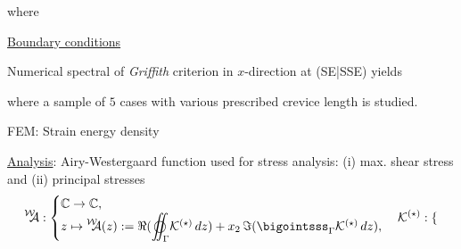 \documentclass[25pt, a0paper,
portrait,
margin=2mm, 
innermargin=2mm, 
blockverticalspace=7mm, %
colspace=2mm, %
subcolspace=0mm]{tikzposter}
\makeatletter
\newcommand*{\inputfig}[3][htb]{{
    \def\fps@figure{#1}
    \def\DIR{#2}
    \def\LABEL{#3}
    \graphicspath{{\DIR/}}
    
}}
\newcommand{\WA}{\prescript{\mathcal{W}}{}{\!\!\!\mathcal{A}}}
\newcommand{\WAz}{\prescript{\mathcal{W}}{}{\!\!\!\mathcal{A}}(z)}
\newcommand{\mbC}{\mathbb{C}}
\newcommand{\mcK}{\mathcal{K}}
\newcommand{\bigoiintssss}{\mathlarger{\varoiint}}
\makeatother
\begin{document}
{\begin{minipage}{0.43\textwidth}
\begin{mdframed}
			where
		\end{mdframed}
	\end{minipage}
	\hfill
	\begin{minipage}{0.54\textwidth}
		\begin{minipage}{0.7\textwidth}
			\begin{mdframed}
				\underline{Boundary conditions}
				\begin{center}
					\inputfig{floats/structuraltwofields}{structuraltwofields}
				\end{center}
			\end{mdframed}
			\begin{mdframed}
				Numerical spectral of \emph{Griffith} criterion in $x$-direction at (SE|SSE) yields
				\begin{center}
					\inputfig{floats/routine_woTV_numa_one}{routine_woTV_numa_one}
				\end{center}
				where a sample of $5$ cases with various prescribed crevice length is studied.
			\end{mdframed}
		\end{minipage}
		\hfill 
		\begin{minipage}{0.3\textwidth}
			\begin{mdframed}
				FEM: Strain energy density
				\vspace{0.1cm}
				\inputfig{floats/griffith_flowchart_circle_formula}{griffith_flowchart_circle_formula}
			\end{mdframed}
		\end{minipage}
		\begin{mdframed}
			\underline{Analysis}: Airy-Westergaard function used for stress analysis:
			(i) max. shear stress and (ii) principal stresses
			\begin{align*}
				\WA:
				\begin{cases}
					\mbC\to\mbC, \\
					z \mapsto \WAz:=
					\Re(\bigoiintssss_{\Gamma} \mcK^{(\star)}\,dz )
					+ x_2\,
					\Im(\bigointsss_{\Gamma} \mcK^{(\star)}\,dz ),
				\end{cases}
				\mcK^{(\star)}:
				\begin{cases}

\end{cases}
\end{align*}
\end{mdframed}
\end{minipage}}
\end{document}
